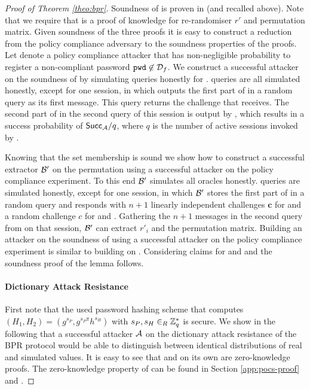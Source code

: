 \begin{proof}[Proof of Theorem \ref{theo:bpr}]
\noindent
Soundness of \PoS is proven in \cite{FurukawaS01,Furukawa05} (and recalled above).
Note that we require that \PoS is a proof of knowledge for re-randomiser $r'$ and permutation matrix.
Given soundness of the three proofs it is easy to construct a reduction from the policy compliance adversary to the soundness properties of the proofs.
Let \cA denote a policy compliance attacker that has non-negligible probability to register a non-compliant password  $\mathtt{pwd}\not\in\mathcal{D}_f$.
We construct a successful attacker \cB on the soundness of \PoM by simulating \Execute queries honestly for \cA.
\Send queries are all simulated honestly, except for one session, in which \cB outputs the first part of \PoM in a random \Send query as its first message.
This \Send query returns the challenge that \cB receives.
The second part of \PoM in the second \Send query of this session is output by \cB, which results in a success probability of $\mathsf{Succ}_{\mathcal{A}}/q$, where $q$ is the number of active sessions invoked by \cA.

Knowing that the set membership \PoM is sound we show how to construct a successful extractor $\mathcal{B}'$ on the permutation \PoS using a successful attacker \cA on the policy compliance experiment.
To this end $\mathcal{B}'$ simulates all \Execute oracles honestly.
\Send queries are simulated honestly, except for one session, in which $\mathcal{B}'$ stores the first part of \PoS in a random \Send query and responds with $n+1$ linearly independent challenges $\bm c$ for \PoS and a random challenge $c$ for \PoM and \PoE.
Gathering the $n+1$ messages in the second \Send query from \cA on that session, $\mathcal{B}'$ can extract $r'_i$ and the permutation matrix.
Building an attacker on the soundness of \PoE using a successful attacker \cA on the policy compliance experiment is similar to building \cB on \PoM.
Considering claims for \PoM and \PoE and the soundness proof of \PoS the lemma follows.
% 

\paragraph{Dictionary Attack Resistance}
First note that the used password hashing scheme that computes $(H_1,H_2)=(g^{s_P},\allowbreak g^{s_P \pi}h^{s_H})$ with $s_P,s_H\in_R\mathbb{Z}^\ast_q$ is secure.
We show in the following that a successful attacker $\mathcal{A}$ on the dictionary attack resistance of the BPR protocol would be able to distinguish between identical distributions of real and simulated values.
It is easy to see that \PoM and \PoE on its own are zero-knowledge proofs.
The zero-knowledge property of \PoS can be found in Section \ref{app:pocs-proof} and \cite{FurukawaS01,Furukawa05}.


\end{proof}
